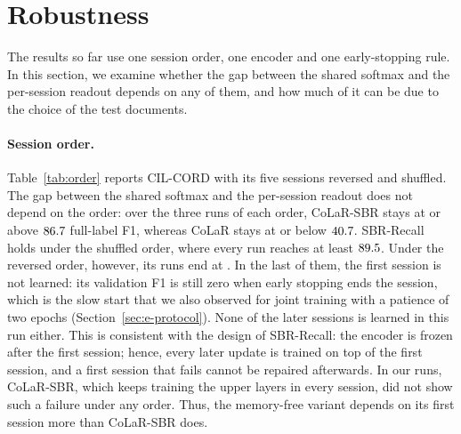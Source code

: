 \begin{table}[!htbp]
  \centering
  \caption[Settings of CoLaR-SBR]{\textbf{Settings of CoLaR-SBR} on CIL-CORD: one setting
  changes at a time (bold: the default; mean $\pm$ s.d.).}
  \label{tab:analysis}
  
\end{table}

\section{Robustness}
\label{sec:c6-s6}

The results so far use one session order, one encoder and one early-stopping rule. In this
section, we examine whether the gap between the shared softmax and the per-session readout
depends on any of them, and how much of it can be due to the choice of the test documents.

\paragraph{Session order.} Table~\ref{tab:order} reports CIL-CORD with its five sessions
reversed and shuffled. The gap between the shared softmax and the per-session readout does
not depend on the order: over the three runs of each order, CoLaR-SBR stays at or above
$86.7$ full-label F1, whereas CoLaR stays at or below $40.7$.
SBR-Recall holds under the shuffled order, where every run reaches at least
$89.5$. Under the reversed order, however, its runs end at
\nOrderRevRecallRuns. In the last of them, the first session is not learned: its
validation F1 is still zero when early stopping ends the session, which is the slow start
that we also observed for joint training with a patience of two epochs
(Section~\ref{sec:e-protocol}). None of the later sessions is learned in this run either.
This is consistent with the design of SBR-Recall: the encoder is frozen after the first
session; hence, every later update is trained on top of the first session, and a first
session that fails cannot be repaired afterwards. In our runs, CoLaR-SBR, which keeps
training the upper layers in every session, did not show such a failure under any order.
Thus, the memory-free variant depends on its first session more than CoLaR-SBR does.

\begin{table}[!htbp]
  \centering
  \caption[Session order on CIL-CORD]{\textbf{Session order} on CIL-CORD (full-label F1;
  mean $\pm$ s.d.). $^{f}$The three runs: one of them fails in its first session.}
  \label{tab:order}
  
\end{table}

